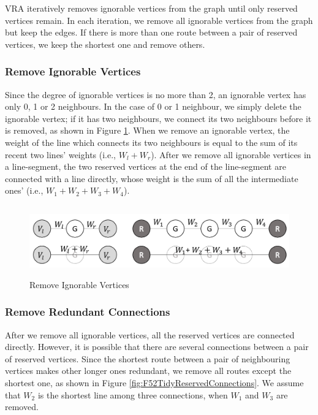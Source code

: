 \noindent VRA iteratively removes ignorable vertices from the graph until only reserved vertices remain. In each iteration, we remove all ignorable vertices from the graph but keep the edges. If there is more than one route between a pair of reserved vertices, we keep the shortest one and remove others. 


\subsubsection{ Remove Ignorable Vertices}\label{subsubsec_RIV}

\noindent Since the degree of ignorable vertices is no more than 2, an ignorable vertex has only 0, 1 or 2 neighbours. In the case of 0 or 1 neighbour, we simply delete the ignorable vertex; if it has two neighbours, we connect its two neighbours before it is removed, as shown in Figure \ref{fig:RemoveIgnorableVertices}. When we remove an ignorable vertex, the weight of the line which connects its two neighbours is equal to the sum of its recent two lines' weights (i.e., $W_l+W_r$). After we remove all ignorable vertices in a line-segment, the two reserved vertices at the end of the line-segment are connected with a line directly, whose weight is the sum of all the intermediate ones' (i.e., $W_1+W_2+W_3+W_4$).

\begin{figure} [hbtp]
  \centering 
  \includegraphics[height=1.2in]{figures/F51RemoveIgnorableVertices.png}
  \caption{Remove Ignorable Vertices} 
  \label{fig:RemoveIgnorableVertices} %
\end{figure}

\subsubsection{ Remove Redundant Connections}\label{subsubsec_RRC}

\noindent After we remove all ignorable vertices, all the reserved vertices are connected directly. However, it is possible that there are several connections between a pair of reserved vertices. Since the shortest route between a pair of neighbouring vertices makes other longer ones redundant, we remove all routes except the shortest one, as shown in Figure \ref{fig:F52TidyReservedConnections}. We assume that $W_2$ is the shortest line among three connections, when $W_1$ and $W_3$ are removed.

